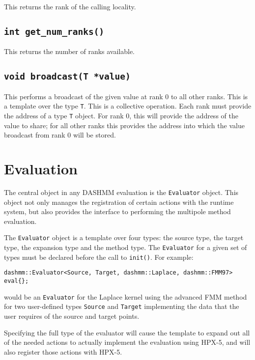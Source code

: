 This returns the rank of the calling locality.

\subsection{{\tt int get\_num\_ranks()}}

This returns the number of ranks available.

\subsection{{\tt void broadcast(T *value)}}

This performs a broadcast of the given value at rank 0 to all other ranks.
This is a template over the type {\tt T}. This is a collective operation. Each
rank must provide the address of a type {\tt T} object. For rank 0, this will
provide  the address of the value to share; for all other ranks this provides
the address into which the value broadcast from rank 0 will be stored.

\section{Evaluation}

The central object in any DASHMM evaluation is the {\tt Evaluator} object. This
object not only manages the registration of certain actions with the runtime
system, but also provides the interface to performing the multipole method
evaluation.

The {\tt Evaluator} object is a template over four types: the source type, the
target type, the expansion type and the method type. The {\tt Evaluator} for a
given set of types must be declared before the call to {\tt init()}. For
example:

\begin{verbatim}
dashmm::Evaluator<Source, Target, dashmm::Laplace, dashmm::FMM97> eval{};
\end{verbatim}

\noindent would be an {\tt Evaluator} for the Laplace kernel using the
advanced FMM method for two user-defined types
{\tt Source} and {\tt Target} implementing the data that the user requires
of the source and target points.

Specifying the full type of the evaluator will cause the template to expand
out all of the needed actions to actually implement the evaluation using
HPX-5, and will also register those actions with HPX-5.


